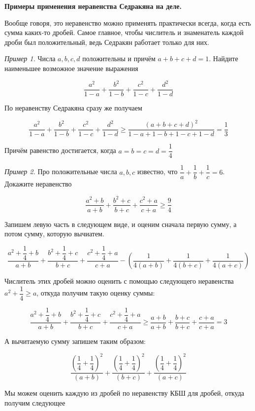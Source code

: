 \newpage

\hspace{3mm}

\centerline{\bf \large Примеры применения неравенства Седракяна на деле.}

Вообще говоря, это неравенство можно применять практически всегда, когда есть сумма каких-то дробей. Самое главное, чтобы числитель и знаменатель каждой дроби был положительный, ведь Седракян работает только для них.

\textit{Пример 1.}
Числа $a, b, c, d$ положительны и причём $a+b+c+d=1$. Найдите наименьшее возможное значение выражения

$$
\dfrac{a^2}{1-a}+\dfrac{b^2}{1-b}+\dfrac{c^2}{1-c}+\dfrac{d^2}{1-d}
$$

По неравенству Седракяна сразу же получаем

$$
\dfrac{a^2}{1-a}+\dfrac{b^2}{1-b}+\dfrac{c^2}{1-c}+\dfrac{d^2}{1-d} \geqslant \dfrac{(a+b+c+d)^2}{1-a+1-b+1-c+1-d}=\dfrac{1}{3}
$$

Причём равенство достигается, когда $a = b = c = d = \dfrac{1}{4}$

\textit{Пример 2.}
Про положительные числа $a, b, c$ известно, что $\dfrac{1}{a}+\dfrac{1}{b}+\dfrac{1}{c}=6$. Докажите неравенство

$$
\dfrac{a^2+b}{a+b}+\dfrac{b^2+c}{b+c}+\dfrac{c^2+a}{c+a} \geqslant \dfrac{9}{4}
$$

Запишем левую часть в следующем виде, и оценим сначала первую сумму, а потом сумму, которую вычиатем.

$$
\dfrac{a^2+\dfrac{1}{4}+b}{a+b}+\dfrac{b^2+\dfrac{1}{4}+c}{b+c}+\dfrac{c^2+\dfrac{1}{4}+a}{c+a}-\left(\dfrac{1}{4(a+b)}+\dfrac{1}{4(b+c)}+\dfrac{1}{4(a+c)}\right)
$$


Числитель этих дробей можно оценить с помощью следующего неравенства $a^2+\dfrac{1}{4} \geqslant a$, откуда получим такую оценку суммы:

$$
\dfrac{a^2+\dfrac{1}{4}+b}{a+b}+\dfrac{b^2+\dfrac{1}{4}+c}{b+c}+\dfrac{c^2+\dfrac{1}{4}+a}{c+a} \geqslant \dfrac{a+b}{a+b}+\dfrac{b+c}{b+c}+\dfrac{c+a}{c+a}=3
$$


А вычитаемую сумму запишем таким образом:

$$
\dfrac{\left(\dfrac{1}{4}+\dfrac{1}{4}\right)^2}{(a+b)}+\dfrac{\left(\dfrac{1}{4}+\dfrac{1}{4}\right)^2}{(b+c)}+\dfrac{\left(\dfrac{1}{4}+\dfrac{1}{4}\right)^2}{(a+c)}
$$


Мы можем оценить каждую из дробей по неравенству КБШ для дробей, откуда получим следующее

